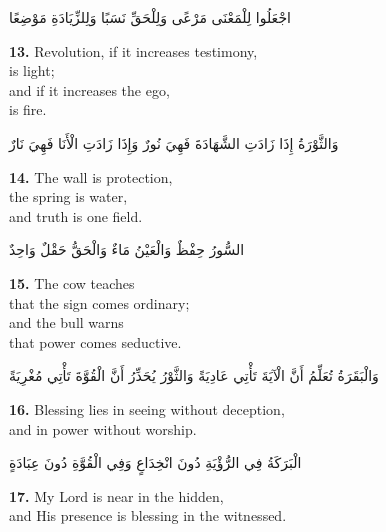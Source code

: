 \documentclass[11pt,a4paper,twoside]{book}
\begin{document}
\begin{flushright}
{\arabicfont
اجْعَلُوا لِلْمَعْنَى مَرْعًى
وَلِلْحَقِّ نَسَبًا
وَلِلزِّيَادَةِ مَوْضِعًا}
\end{flushright}

\vspace{1em}
{\color{indigo}\bfseries 13.}\quad
Revolution, if it increases testimony,\\
is light;\\
and if it increases the ego,\\
is fire.

\begin{flushright}
{\arabicfont
وَالثَّوْرَةُ إِذَا زَادَتِ الشَّهَادَةَ
فَهِيَ نُورٌ
وَإِذَا زَادَتِ الْأَنَا
فَهِيَ نَارٌ}
\end{flushright}

\vspace{1em}
{\color{indigo}\bfseries 14.}\quad
The wall is protection,\\
the spring is water,\\
and truth is one field.

\begin{flushright}
{\arabicfont
السُّورُ حِفْظٌ
وَالْعَيْنُ مَاءٌ
وَالْحَقُّ حَقْلٌ وَاحِدٌ}
\end{flushright}

\vspace{1em}
{\color{indigo}\bfseries 15.}\quad
The cow teaches\\
that the sign comes ordinary;\\
and the bull warns\\
that power comes seductive.

\begin{flushright}
{\arabicfont
وَالْبَقَرَةُ تُعَلِّمُ
أَنَّ الْآيَةَ تَأْتِي عَادِيَةً
وَالثَّوْرُ يُحَذِّرُ
أَنَّ الْقُوَّةَ تَأْتِي مُغْرِيَةً}
\end{flushright}

\vspace{1em}
{\color{indigo}\bfseries 16.}\quad
Blessing lies in seeing without deception,\\
and in power without worship.

\begin{flushright}
{\arabicfont
الْبَرَكَةُ فِي الرُّؤْيَةِ دُونَ انْخِدَاعٍ
وَفِي الْقُوَّةِ دُونَ عِبَادَةٍ}
\end{flushright}

\vspace{1em}
{\color{indigo}\bfseries 17.}\quad
My Lord is near in the hidden,\\
and His presence is blessing in the witnessed.
\end{document}
